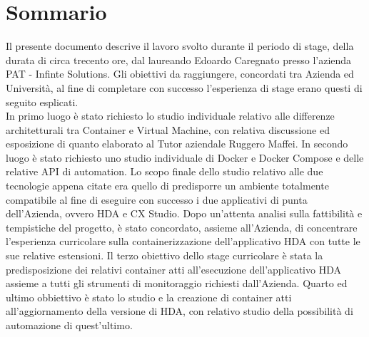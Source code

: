 
\cleardoublepage
{}
{}
\begingroup
\let\clearpage\relax
\let\cleardoublepage\relax
\let\cleardoublepage\relax

\chapter*{Sommario}

Il presente documento descrive il lavoro svolto durante il periodo di stage, della durata di circa trecento ore, dal laureando Edoardo Caregnato presso l'azienda PAT - Infinte Solutions.
Gli obiettivi da raggiungere, concordati tra Azienda ed Università, al fine di completare con successo l'esperienza di stage erano questi di seguito esplicati.\\
In primo luogo è stato richiesto lo studio individuale relativo alle differenze architetturali tra \gls{Container} e \gls{Virtual Machine}, con relativa discussione ed esposizione di quanto elaborato al Tutor aziendale Ruggero Maffei.
In secondo luogo è stato richiesto uno studio individuale di \gls{Docker} e \gls{Docker Compose} e delle relative \gls{API} di automation. Lo scopo finale dello studio relativo alle due tecnologie appena citate era quello di predisporre un ambiente totalmente compatibile al fine di eseguire con successo i due applicativi di punta dell'Azienda, ovvero \gls{HDA} e \gls{CX Studio}. Dopo un'attenta analisi sulla fattibilità e tempistiche del progetto, è stato concordato, assieme all'Azienda, di concentrare l'esperienza curricolare sulla containerizzazione dell'applicativo \gls{HDA} con tutte le sue relative estensioni.
Il terzo obiettivo dello stage curricolare è stata la predisposizione dei relativi container atti all'esecuzione dell'applicativo \gls{HDA} assieme a tutti gli strumenti di monitoraggio richiesti dall'Azienda.
Quarto ed ultimo obbiettivo è stato lo studio e la creazione di container atti all'aggiornamento della versione di \gls{HDA}, con relativo studio della possibilità di automazione di quest'ultimo.

%
%

\endgroup			

\vfill

